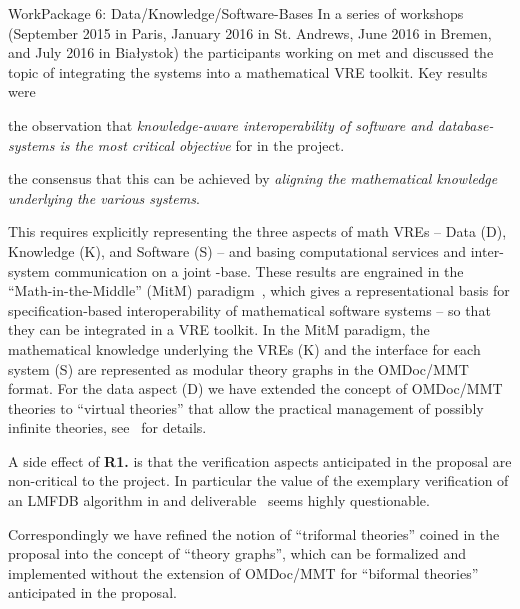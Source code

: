 \documentclass{deliverablereport}
\makeatletter
\renewcommand\subsubsection{\@startsection{subsubsection}{2}%
  \z@{.5\linespacing\@plus.7\linespacing}{.1\linespacing}%
  {\normalfont\bfseries}}
\makeatother
\begin{document}
\clearpage
  \subsubsection{WorkPackage 6:  Data/Knowledge/Software-Bases}
  \label{dksbases}
  In a series of workshops (September 2015 in Paris, January 2016 in St. Andrews, June
  2016 in Bremen, and July 2016 in Bia{\l}ystok) the participants working on
   met and discussed the topic of integrating the \pn systems into a
  mathematical VRE toolkit.  Key results were
  \begin{compactitem}[\bf R1.]
  \item the observation that \emph{knowledge-aware interoperability of software and
      database-systems is the most critical objective} for  in the \pn
    project.
  \item the consensus that this can be achieved by \emph{aligning the mathematical
      knowledge underlying the various systems}.
  \end{compactitem}
  This requires explicitly representing the three aspects of math VREs -- Data (D),
  Knowledge (K), and Software (S) -- and basing computational services and inter-system
  communication on a joint \DKS-base. These results are engrained in the
  ``Math-in-the-Middle'' (MitM) paradigm~\cite{DehKohKon:iop16}, which gives a
  representational basis for specification-based interoperability of mathematical software
  systems -- so that they can be integrated in a VRE toolkit. In the MitM paradigm, the
  mathematical knowledge underlying the VREs (K) and the interface for each
  system (S) are represented as modular theory graphs in the OMDoc/MMT format. For the
  data aspect (D) we have extended the concept of OMDoc/MMT theories to ``virtual
  theories'' that allow the practical management of possibly infinite theories,
  see~\cite{ODK-D6.2} for details.

  A side effect of \textbf{R1.} is that the verification aspects anticipated in the
  proposal are non-critical to the \pn project. In particular the value of the exemplary
  verification of an LMFDB algorithm in  and
  deliverable~ seems highly questionable.

  Correspondingly we have refined the notion of ``triformal theories'' coined in the
  proposal into the concept of ``\DKS theory graphs'', which can be formalized and
  implemented without the extension of OMDoc/MMT for ``biformal theories'' anticipated in
  the proposal.
\end{document}
